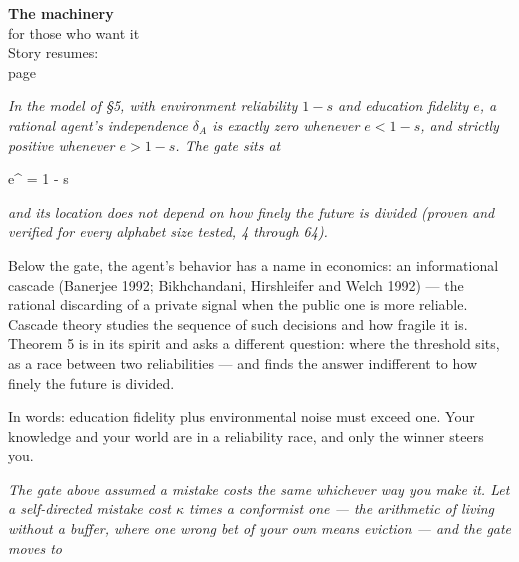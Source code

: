 \begin{machinery}{\textbf{The machinery}\\for those who want it\\[3pt]{\color{muted}Story resumes:\\page~\pageref{ch6}}}



\label{claim-3}

\noindent \emph{In the model of §5, with environment reliability \(1-s\) and education fidelity \(e\), a rational agent's independence \(\delta_A\) is exactly zero whenever \(e < 1-s\), and strictly positive whenever \(e > 1-s\). The gate sits at}

\begin{dispmath}e^{\ast} = 1 - s\end{dispmath}

\noindent \emph{and its location does not depend on how finely the future is divided
(proven and verified for every alphabet size tested, 4 through 64).}


Below the gate, the agent's behavior has a name in economics: an informational cascade (Banerjee 1992; Bikhchandani, Hirshleifer and Welch 1992) --- the rational discarding of a private signal when the public one is more reliable. Cascade theory studies the sequence of such decisions and how fragile it is. Theorem 5 is in its spirit and asks a different question: where the threshold sits, as a race between two reliabilities --- and finds the answer indifferent to how finely the future is divided.

In words: education fidelity plus environmental noise must exceed one.
Your knowledge and your world are in a reliability race, and only the
winner steers you.


\label{claim-4}

\noindent \emph{The gate above
assumed a mistake costs the same whichever way you make it. Let a self-directed mistake cost \(\kappa\) times a conformist one --- the arithmetic
of living without a buffer, where one wrong bet of your own means
eviction --- and the gate moves to}


\end{machinery}
